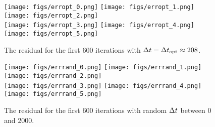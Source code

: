 \documentclass[11pt]{article}
\begin{document}
    \begin{figure}[ht]
    \begin{center}
    \texttt{[image: figs/erropt\_0.png]} 
        \texttt{[image: figs/erropt\_1.png]}  
        \texttt{[image: figs/erropt\_2.png]}\\  
        \texttt{[image: figs/erropt\_3.png]} 
        \texttt{[image: figs/erropt\_4.png]}  
        \texttt{[image: figs/erropt\_5.png]}  
    \end{center}
    \caption{The residual for the first 600 iterations with $\Delta t = \Delta t_{\text{opt}}\approx 208$.}
    \label{fig:exps1}
    \end{figure}


    \begin{figure}[ht]
    \begin{center}
    \texttt{[image: figs/errrand\_0.png]} 
        \texttt{[image: figs/errrand\_1.png]}  
        \texttt{[image: figs/errrand\_2.png]}\\  
        \texttt{[image: figs/errrand\_3.png]} 
        \texttt{[image: figs/errrand\_4.png]}  
        \texttt{[image: figs/errrand\_5.png]}  
    \end{center}
    \caption{The residual for the first 600 iterations with random $\Delta t$ between 0 and 2000.}
    \label{fig:exps2}
    \end{figure}
\end{document}
